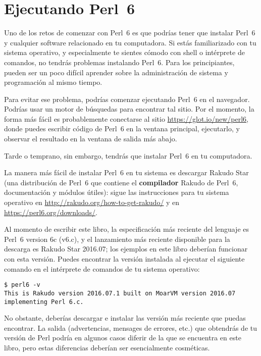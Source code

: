\section{Ejecutando Perl~6}
\label{running_perl_6}

Uno de los retos de comenzar con Perl~6 es que podrías tener que instalar
Perl~6 y cualquier software relacionado en tu computadora. Si estás familiarizado
con tu sistema operativo, y especialmente te sientes cómodo con shell o
intérprete de comandos, no tendrás problemas instalando Perl~6. Para los 
principiantes, pueden ser un poco difícil aprender sobre la
administración de sistema y programación al mismo tiempo.

Para evitar ese problema, podrías comenzar ejecutando Perl~6 en
el navegador. Podrías usar un motor de búsquedas para encontrar tal
sitio. Por el momento, la forma más fácil es probablemente conectarse
al sitio \url{https://glot.io/new/perl6}, donde puedes escribir código
de Perl~6 en la ventana principal, ejecutarlo, y observar el resultado 
en la ventana de salida más abajo.

Tarde o temprano, sin embargo, tendrás que instalar Perl~6 en tu computadora.

La manera más fácil de instalar Perl~6 en tu sistema es descargar 
Rakudo Star (una distribución de Perl~6 que contiene el {\bf compilador}
Rakudo de Perl~6, documentación y módulos útiles): sigue las instrucciones 
para tu sistema operativo en
\url{http://rakudo.org/how-to-get-rakudo/} y en 
\url{https://perl6.org/downloads/}. 

Al momento de escribir este libro, la especificación más reciente del 
lenguaje es Perl~6 version 6c (v6.c), y el lanzamiento más reciente disponible
para la descarga es Rakudo Star 2016.07; los ejemplos en este libro deberían
funcionar con esta versión. Puedes encontrar la versión instalada al ejecutar
el siguiente comando en el intérprete de comandos de tu sistema operativo:
\begin{verbatim}
$ perl6 -v
This is Rakudo version 2016.07.1 built on MoarVM version 2016.07
implementing Perl 6.c.
\end{verbatim}

No obstante, deberías descargar e instalar las versión más reciente que puedas
encontrar. La salida (advertencias, mensages de errores, etc.) que obtendrás de tu versión de Perl
podría en algunos casos diferir de la que se encuentra en este libro, pero estas diferencias
deberían ser esencialmente cosméticas.

